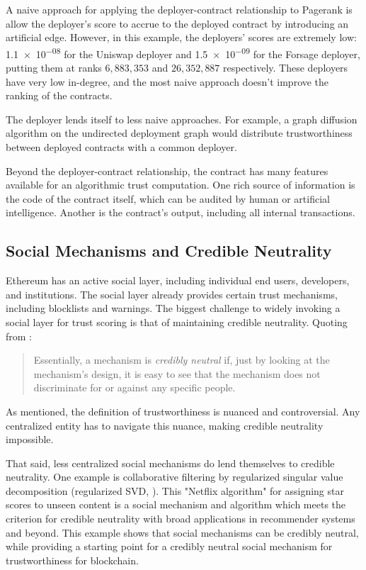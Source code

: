\documentclass[a4paper]{article}
\begin{document}
A naive approach for applying the deployer-contract relationship to Pagerank is allow the deployer's score to accrue to the deployed contract by introducing an artificial edge.  However, in this example, the deployers' scores are extremely low:  \num{1.1e-08} for the Uniswap deployer and \num{1.5e-09} for the Forsage deployer, putting them at ranks $6,883,353$ and $26,352,887$ respectively.  These deployers have very low in-degree, and the most naive approach doesn't improve the ranking of the contracts.
	
The deployer lends itself to less naive approaches.  For example, a graph diffusion algorithm on the undirected deployment graph would distribute trustworthiness between deployed contracts with a common deployer.

Beyond the deployer-contract relationship, the contract has many features available for an algorithmic trust computation.  One rich source of information is the code of the contract itself, which can be audited by human or artificial intelligence.  Another is the contract's output, including all internal transactions.

\subsection{Social Mechanisms and Credible Neutrality}

Ethereum has an active social layer, including individual end users, developers, and institutions.  The social layer already provides certain trust mechanisms, including blocklists and warnings. The biggest challenge to widely invoking a social layer for trust scoring is that of maintaining credible neutrality.  Quoting from \cite{Vitalik}:
\begin{quote}
Essentially, a mechanism is {\it credibly neutral} if, just by looking at the mechanism’s design, it is easy to see that the mechanism does not discriminate for or against any specific people.
\end{quote}
As mentioned, the definition of trustworthiness is nuanced and controversial. Any centralized entity has to navigate this nuance, making credible neutrality impossible.

That said, less centralized social mechanisms do lend themselves to credible neutrality.  One example is collaborative filtering by regularized singular value decomposition (regularized SVD, \cite{Netflix1, Netflix2}).  This "Netflix algorithm" for assigning star scores to unseen content is a social mechanism and algorithm which meets the criterion for credible neutrality with broad applications in recommender systems and beyond.  This example shows that social mechanisms can be credibly neutral, while providing a starting point for a credibly neutral social mechanism for trustworthiness for blockchain.
\end{document}
